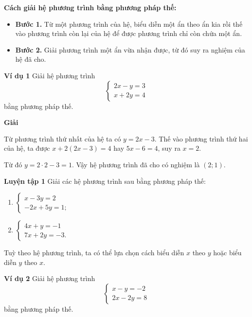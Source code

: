 \begin{lesson}
    \answerline
    \answerline
    \answerline

    \begin{keyconcept}
        \textbf{Cách giải hệ phương trình bằng phương pháp thế:}
        \begin{itemize}
            \item \textbf{Bước 1.} Từ một phương trình của hệ, biểu diễn một ẩn theo ẩn kia rồi thế vào phương trình còn lại của hệ để được phương trình chỉ còn chứa một ẩn.
            \item \textbf{Bước 2.} Giải phương trình một ẩn vừa nhận được, từ đó suy ra nghiệm của hệ đã cho.
        \end{itemize}
    \end{keyconcept}

    \textbf{Ví dụ 1} Giải hệ phương trình
    \[
        \begin{cases}
            2x-y=3\\
            x+2y=4
        \end{cases}
    \]
    bằng phương pháp thế.

    \textbf{Giải}

    Từ phương trình thứ nhất của hệ ta có $y=2x-3$. Thế vào phương trình thứ hai của hệ, ta được $x+2(2x-3)=4$ hay $5x-6=4$, suy ra $x=2$.

    Từ đó $y=2\cdot2-3=1$. Vậy hệ phương trình đã cho có nghiệm là $(2;1)$.

    \textbf{Luyện tập 1} Giải các hệ phương trình sau bằng phương pháp thế:
    \begin{enumerate}[label=\alph*)]
        \item $\begin{cases}x-3y=2\\-2x+5y=1;\end{cases}$
        \item $\begin{cases}4x+y=-1\\7x+2y=-3.\end{cases}$
    \end{enumerate}

    \answerline
    \answerline
    \answerline

    Tuỳ theo hệ phương trình, ta có thể lựa chọn cách biểu diễn $x$ theo $y$ hoặc biểu diễn $y$ theo $x$.

    \textbf{Ví dụ 2} Giải hệ phương trình
    \[
        \begin{cases}
            x-y=-2\\
            2x-2y=8
        \end{cases}
    \]
    bằng phương pháp thế.


\end{lesson}
